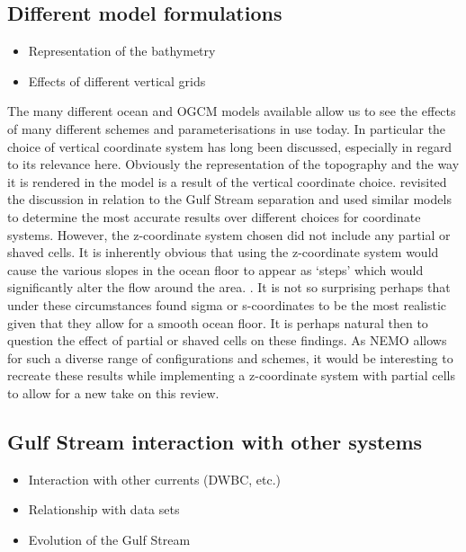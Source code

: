 \documentclass[..\EOYR.tex]{subfiles}
\begin{document}
\subsection{Different model formulations}
\begin{itemize}
  \item Representation of the bathymetry
  \item Effects of different vertical grids
\end{itemize}

The many different ocean and OGCM models available allow us to see the effects of many different schemes and parameterisations in use today. In particular the choice of vertical coordinate system has long been discussed, especially in regard to its relevance here. Obviously the representation of the topography and the way it is rendered in the model is a result of the vertical coordinate choice. \citep{Ezer2016b} revisited the discussion in relation to the Gulf Stream separation and used similar models to determine the most accurate results over different choices for coordinate systems. However, the z-coordinate system chosen did not include any partial or shaved cells. It is inherently obvious that using the z-coordinate system would cause the various slopes in the ocean floor to appear as ‘steps’ which would significantly alter the flow around the area. . It is not so surprising perhaps that under these circumstances \citep{Ezer2016b} found sigma or s-coordinates to be the most realistic given that they allow for a smooth ocean floor. It is perhaps natural then to question the effect of partial or shaved cells on these findings. As NEMO allows for such a diverse range of configurations and schemes, it would be interesting to recreate these results while implementing a z-coordinate system with partial cells to allow for a new take on this review. 

\subsection{Gulf Stream interaction with other systems}
\begin{itemize}
  \item Interaction with other currents   (DWBC, etc.)
  \item Relationship with data sets
  \item Evolution of the Gulf Stream
\end{itemize}
\end{document}
